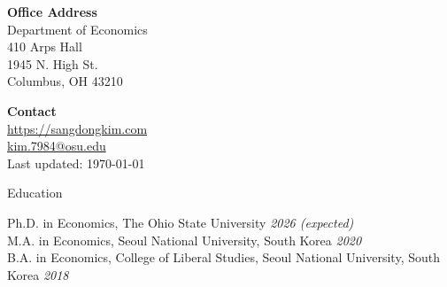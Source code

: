 \documentclass{cv} %
\begin{document}
\begin{minipage}{0.49\textwidth}
	\begin{flushleft}
		\textbf{Office Address} \\
		Department of Economics \\
		410 Arps Hall \\
		1945 N. High St.  \\
		Columbus, OH 43210
	\end{flushleft}
\end{minipage}
\begin{minipage}{0.49\textwidth}
	\begin{flushright}
		\textbf{Contact} \\
		\href{https://sangdongkim.com}{https://sangdongkim.com}\\
		\href{mailto:kim.7984@osu.edu}{kim.7984@osu.edu} \\
		Last updated: \today
		\\
	\end{flushright}
\end{minipage}
\bigskip

\begin{rSection}{Education}

{Ph.D. in Economics, The Ohio State University} \hfill {\em 2026 (expected)} \\
{M.A. in Economics, Seoul National University, South Korea} \hfill {\em 2020} \\
{B.A. in Economics, College of Liberal Studies, Seoul National University, South Korea} \hfill {\em 2018}
\end{rSection}
\bigskip
\end{document}
